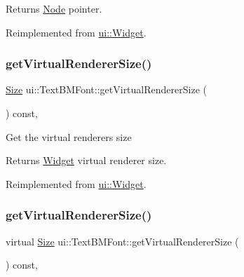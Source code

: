 \begin{DoxyReturn}{Returns}
\hyperlink{classNode}{Node} pointer. 
\end{DoxyReturn}


Reimplemented from \hyperlink{classui_1_1Widget_acf862bf9235fbb3823819eeb65d46f25}{ui\+::\+Widget}.

\mbox{\label{classui_1_1TextBMFont_a8fb5c5f091852376a0060487c1981943}} 
\subsubsection{\texorpdfstring{get\+Virtual\+Renderer\+Size()}{getVirtualRendererSize()}\hspace{0.1cm}{\footnotesize\ttfamily [1/2]}}
{\footnotesize\ttfamily \hyperlink{classSize}{Size} ui\+::\+Text\+B\+M\+Font\+::get\+Virtual\+Renderer\+Size (\begin{DoxyParamCaption}{ }\end{DoxyParamCaption}) const\hspace{0.3cm}{\ttfamily [override]}, {\ttfamily [virtual]}}

Get the virtual renderer\textquotesingle{}s size \begin{DoxyReturn}{Returns}
\hyperlink{classui_1_1Widget}{Widget} virtual renderer size. 
\end{DoxyReturn}


Reimplemented from \hyperlink{classui_1_1Widget_a2ed0d41565593f78dc59c975d58a869e}{ui\+::\+Widget}.

\mbox{\label{classui_1_1TextBMFont_a9ee876578d52a27bc967271ea3fa2b19}} 
\subsubsection{\texorpdfstring{get\+Virtual\+Renderer\+Size()}{getVirtualRendererSize()}\hspace{0.1cm}{\footnotesize\ttfamily [2/2]}}
{\footnotesize\ttfamily virtual \hyperlink{classSize}{Size} ui\+::\+Text\+B\+M\+Font\+::get\+Virtual\+Renderer\+Size (\begin{DoxyParamCaption}{ }\end{DoxyParamCaption}) const\hspace{0.3cm}{\ttfamily [override]}, {\ttfamily [virtual]}}

